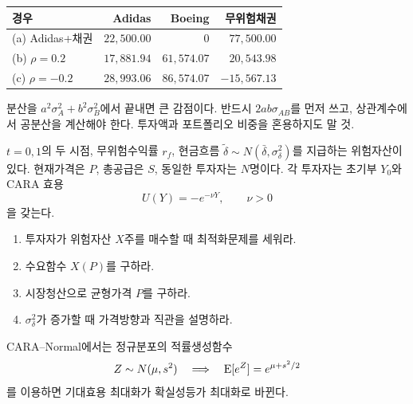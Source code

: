 \begin{answerbox}
\begin{center}
\begin{tabular}{lrrr}
\toprule
경우 & Adidas & Boeing & 무위험채권 \\
\midrule
(a) Adidas+채권 & $22{,}500.00$ & $0$ & $77{,}500.00$ \\
(b) $\rho=0.2$ & $17{,}881.94$ & $61{,}574.07$ & $20{,}543.98$ \\
(c) $\rho=-0.2$ & $28{,}993.06$ & $86{,}574.07$ & $-15{,}567.13$ \\
\bottomrule
\end{tabular}
\end{center}
\end{answerbox}

\begin{warningbox}
분산을 $a^2\sigma_A^2+b^2\sigma_B^2$에서 끝내면 큰 감점이다. 반드시 $2ab\sigma_{AB}$를 먼저 쓰고, 상관계수에서 공분산을 계산해야 한다. 투자액과 포트폴리오 비중을 혼용하지도 말 것.
\end{warningbox}

\begin{officialbox}
$t=0,1$의 두 시점, 무위험수익률 $r_f$, 현금흐름 $\widetilde\delta\sim N(\bar\delta,\sigma_\delta^2)$를 지급하는 위험자산이 있다. 현재가격은 $P$, 총공급은 $S$, 동일한 투자자는 $N$명이다. 각 투자자는 초기부 $Y_0$와 CARA 효용
\[
U(Y)=-e^{-\nu Y},\qquad \nu>0
\]
을 갖는다.
\begin{enumerate}[label=(\alph*)]
\item 투자자가 위험자산 $X$주를 매수할 때 최적화문제를 세워라.
\item 수요함수 $X(P)$를 구하라.
\item 시장청산으로 균형가격 $P$를 구하라.
\item $\sigma_\delta^2$가 증가할 때 가격방향과 직관을 설명하라.
\end{enumerate}
\end{officialbox}

\begin{strategybox}
CARA--Normal에서는 정규분포의 적률생성함수
\[
Z\sim N(\mu,s^2)\quad\Longrightarrow\quad \operatorname{E}[e^Z]=e^{\mu+s^2/2}
\]
를 이용하면 기대효용 최대화가 확실성등가 최대화로 바뀐다.
\end{strategybox}

